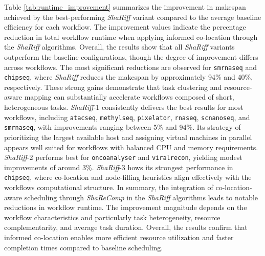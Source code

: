 \noindent
Table \ref{tab:runtime_improvement} summarizes the improvement in makespan achieved by the best-performing \textit{ShaRiff} variant compared to the average baseline efficiency for each workflow. The improvement values indicate the percentage reduction in total workflow runtime when applying informed co-location through the \textit{ShaRiff} algorithms.
Overall, the results show that all \textit{ShaRiff} variants outperform the baseline configurations, though the degree of improvement differs across workflows. The most significant reductions are observed for \texttt{smrnaseq} and \texttt{chipseq}, where \textit{ShaRiff} reduces the makespan by approximately 94\% and 40\%, respectively. These strong gains demonstrate that task clustering and resource-aware mapping can substantially accelerate workflows composed of short, heterogeneous tasks.
\textit{ShaRiff}-1 consistently delivers the best results for most workflows, including \texttt{atacseq}, \texttt{methylseq}, \texttt{pixelator}, \texttt{rnaseq}, \texttt{scnanoseq}, and \texttt{smrnaseq}, with improvements ranging between 5\% and 94\%. Its strategy of prioritizing the largest available host and assigning virtual machines in parallel appears well suited for workflows with balanced CPU and memory requirements. \textit{ShaRiff}-2 performs best for \texttt{oncoanalyser} and \texttt{viralrecon}, yielding modest improvements of around 3\%. \textit{ShaRiff}-3 hows its strongest performance in \texttt{chipseq}, where co-location and node-filling heuristics align effectively with the workflows computational structure.
In summary, the integration of co-location-aware scheduling through \textit{ShaReComp} in the \textit{ShaRiff} algorithms leads to notable reductions in workflow runtime. The improvement magnitude depends on the workflow characteristics and particularly task heterogeneity, resource complementarity, and average task duration. Overall, the results confirm that informed co-location enables more efficient resource utilization and faster completion times compared to baseline scheduling.

